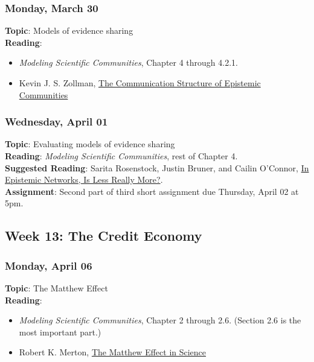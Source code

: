 \documentclass[
  letterpaper,
  DIV=11,
  numbers=noendperiod]{scrartcl}
\providecommand{\tightlist}{%
  \setlength{\itemsep}{0pt}\setlength{\parskip}{0pt}}
\begin{document}
\subsubsection{Monday, March 30}\label{monday-march-30}

\textbf{Topic}: Models of evidence sharing\\
\textbf{Reading}:

\begin{itemize}
\tightlist
\item
  \emph{Modeling Scientific Communities}, Chapter 4 through 4.2.1.
\item
  Kevin J. S. Zollman, \href{https://doi.org/10.1086/525605}{The
  Communication Structure of Epistemic Communities}
\end{itemize}

\subsubsection{Wednesday, April 01}\label{wednesday-april-01}

\textbf{Topic}: Evaluating models of evidence sharing\\
\textbf{Reading}: \emph{Modeling Scientific Communities}, rest of
Chapter 4.\\
\textbf{Suggested Reading}: Sarita Rosenstock, Justin Bruner, and Cailin
O'Connor,
\href{https://cailinoconnor.com/wp-content/uploads/2015/03/In_Epistemic_Networks_Is_Less_Really_Mor-FINAL-VERSION.pdf}{In
Epistemic Networks, Is Less Really More?}.\\
\textbf{Assignment}: Second part of third short assignment due Thursday,
April 02 at 5pm.

\subsection{Week 13: The Credit
Economy}\label{week-13-the-credit-economy}

\subsubsection{Monday, April 06}\label{monday-april-06}

\textbf{Topic}: The Matthew Effect\\
\textbf{Reading}:

\begin{itemize}
\tightlist
\item
  \emph{Modeling Scientific Communities}, Chapter 2 through 2.6.
  (Section 2.6 is the most important part.)
\item
  Robert K. Merton,
  \href{https://www.science.org/doi/10.1126/science.159.3810.56}{The
  Matthew Effect in Science}
\end{itemize}
\end{document}
